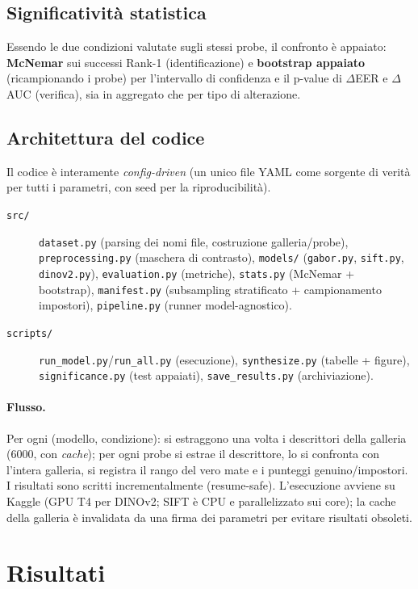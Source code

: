 \documentclass[11pt,a4paper]{article}
\begin{document}
\subsection{Significativit\`a statistica}
Essendo le due condizioni valutate sugli stessi probe, il confronto \`e appaiato:
\textbf{McNemar} sui successi Rank-1 (identificazione) e \textbf{bootstrap
appaiato} (ricampionando i probe) per l'intervallo di confidenza e il p-value di
\(\Delta\)EER e \(\Delta\)AUC (verifica), sia in aggregato che per tipo di
alterazione.

\subsection{Architettura del codice}
Il codice \`e interamente \emph{config-driven} (un unico file YAML come sorgente di
verit\`a per tutti i parametri, con seed per la riproducibilit\`a).

\begin{description}
  \item[\texttt{src/}] \texttt{dataset.py} (parsing dei nomi file, costruzione
    galleria/probe), \texttt{preprocessing.py} (maschera di contrasto),
    \texttt{models/} (\texttt{gabor.py}, \texttt{sift.py}, \texttt{dinov2.py}),
    \texttt{evaluation.py} (metriche), \texttt{stats.py} (McNemar + bootstrap),
    \texttt{manifest.py} (subsampling stratificato + campionamento impostori),
    \texttt{pipeline.py} (runner model-agnostico).
  \item[\texttt{scripts/}] \texttt{run\_model.py}/\texttt{run\_all.py} (esecuzione),
    \texttt{synthesize.py} (tabelle + figure), \texttt{significance.py} (test
    appaiati), \texttt{save\_results.py} (archiviazione).
\end{description}

\paragraph{Flusso.} Per ogni (modello, condizione): si estraggono una volta i
descrittori della galleria (\num{6000}, con \emph{cache}); per ogni probe si estrae
il descrittore, lo si confronta con l'intera galleria, si registra il rango del
vero mate e i punteggi genuino/impostori. I risultati sono scritti
incrementalmente (resume-safe). L'esecuzione avviene su Kaggle (GPU T4 per
DINOv2; SIFT \`e CPU e parallelizzato sui core); la cache della galleria \`e
invalidata da una firma dei parametri per evitare risultati obsoleti.

\section{Risultati}
\end{document}
